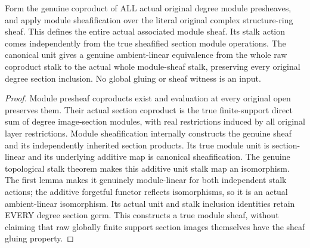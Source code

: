 \begin{definition}
\label{hir:real-domain-actual-normal-associated-module-sheaf}
\leanok
Form the genuine coproduct of ALL actual original degree module
presheaves, and apply module sheafification over the literal original
complex structure-ring sheaf. This defines the entire actual associated
module sheaf. Its stalk action comes independently from the true
sheafified section module operations. The canonical unit gives a
genuine ambient-linear equivalence from the whole raw coproduct stalk
to the actual whole module-sheaf stalk, preserving every original degree
section inclusion. No global gluing or sheaf witness is an input.
\end{definition}
\begin{proof}
Module presheaf coproducts exist and evaluation at every original open
preserves them. Their actual section coproduct is the true finite-support
direct sum of degree image-section modules, with real restrictions
induced by all original layer restrictions. Module sheafification
internally constructs the genuine sheaf and its independently inherited
section products. Its true module unit is section-linear and its
underlying additive map is canonical sheafification. The genuine
topological stalk theorem makes this additive unit stalk map an
isomorphism. The first lemma makes it genuinely module-linear for both
independent stalk actions; the additive forgetful functor reflects
isomorphisms, so it is an actual ambient-linear isomorphism. Its actual
unit and stalk inclusion identities retain EVERY degree section germ.
This constructs a true module sheaf, without claiming that raw globally
finite support section images themselves have the sheaf gluing property.
\end{proof}

